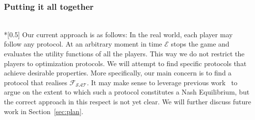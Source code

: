\subsubsection{Putting it all together} \ \\*[0.5\baselineskip]
  Our current approach is as follows: In the real world, each player may follow any
  protocol. At an arbitrary moment in time $\mathcal{E}$ stops the game and evaluates the
  utility functions of all the players. This way we do not restrict the players to
  optimization protocols. We will attempt to find specific protocols that achieve
  desirable properties. More specifically, our main concern is to find a protocol that
  realises $\mathcal{F}_{\mathcal{SAT}}$. It may make sense to leverage previous
  work~\cite{rationalprotocol} to argue on the extent to which such a protocol constitutes
  a Nash Equilibrium, but the correct approach in this respect is not yet clear. We will
  further discuss future work in Section~\ref{sec:plan}.
